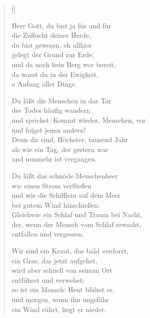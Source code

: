 \begin{multicols}{2}
\settowidth{\versewidth}{Wir sind ein Kraut, das bald verdorrt,}
\begin{verse}[\versewidth]


 Herr Gott, du bist ja für und für\\
die Zuflucht deiner Herde,\\
du bist gewesen, eh allhier\\
gelegt der Grund zur Erde;\\
und da noch kein Berg war bereit,\\
da warst du in der Ewigkeit,\\
o Anfang aller Dinge.

 Du läßt die Menschen in das Tor\\
des Todes häufig wandern\\
und sprichst: Kommt wieder, Menschen, vor\\
und folget jenen andern!\\
Denn dir sind, Höchster, tausend Jahr\\
als wie ein Tag, der gestern war\\
und nunmehr ist vergangen.

 Du läßt das schnöde Menschenheer\\
wie einen Strom verfließen\\
und wie die Schifflein auf dem Meer\\
bei gutem Wind hinschießen:\\
Gleichwie ein Schlaf und Traum bei Nacht,\\
der, wenn der Mensch vom Schlaf erwacht,\\
entfallen und vergessen.

 Wir sind ein Kraut, das bald verdorrt,\\
ein Gras, das jetzt aufgehet,\\
wird aber schnell von seinem Ort\\
entführet und verwehet;\\
so ist ein Mensch: Heut blühet er,\\
und morgen, wann ihn ungefähr\\
ein Wind rührt, liegt er nieder.


\end{verse}
\end{multicols}
